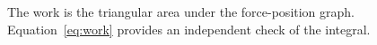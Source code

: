 The work is the triangular area under the force-position graph.
Equation~\eqref{eq:work} provides an independent check of the integral.
